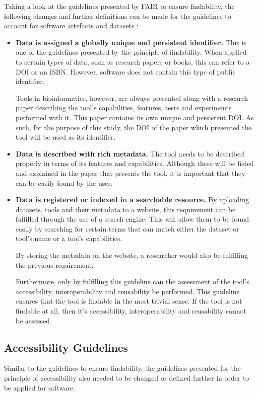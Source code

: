\documentclass{cisfyp}
\begin{document}
Taking a look at the guidelines presented by FAIR to ensure findability, the following changes and further definitions can be made for the guidelines to account for software artefacts and datasets \cite{dbcls}:
\begin{itemize}
	\item \textbf{Data is assigned a globally unique and persistent identifier.}\newline
	This is one of the guidelines presented by the principle of findability. When applied to certain types of data, such as research papers or books, this can refer to a DOI or an ISBN. However, software does not contain this type of public identifier.
	
	Tools in bioinformatics, however, are always presented along with a research paper describing the tool's capabilities, features, tests and experiments performed with it. This paper contains its own unique and persistent DOI. As such, for the purpose of this study, the DOI of the paper which presented the tool will be used as its identifier.
	\item \textbf{Data is described with rich metadata.}\newline
	The tool needs to be described properly in terms of its features and capabilities. Although these will be listed and explained in the paper that presents the tool, it is important that they can be easily found by the user.
	\item \textbf{Data is registered or indexed in a searchable resource.}\newline
	By uploading datasets, tools and their metadata to a website, this requirement can be fulfilled through the use of a search engine. This will allow them to be found easily by searching for certain terms that can match either the dataset or tool's name or a tool's capabilities. 
	
	By storing the metadata on the website, a researcher would also be fulfilling the previous requirement. 
	
	Furthermore, only by fulfilling this guideline can the assessment of the tool's accessibility, interoperability and reusability be performed. This guideline ensures that the tool is findable in the most trivial sense. If the tool is not findable at all, then it's accessibility, interoperability and reusability cannot be assessed.
\end{itemize}\pagebreak

\subsection{Accessibility Guidelines}
Similar to the guidelines to ensure findability, the guidelines presented for the principle of accessibility also needed to be changed or defined further in order to be applied for software.
\end{document}
